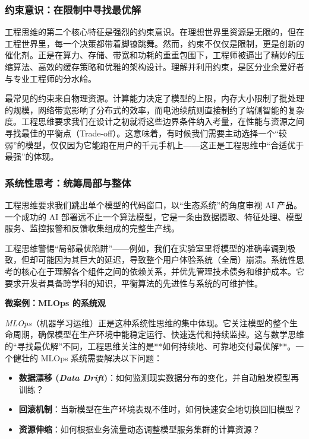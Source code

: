 \subsubsection{约束意识：在限制中寻找最优解}

工程思维的第二个核心特征是强烈的约束意识。在理想世界里资源是无限的，但在工程世界里，每一个决策都带着脚镣跳舞。然而，约束不仅仅是限制，更是创新的催化剂。正是在算力、存储、带宽和功耗的重重包围下，工程师被逼出了精妙的压缩算法、高效的缓存策略和优雅的架构设计。理解并利用约束，是区分业余爱好者与专业工程师的分水岭。

最常见的约束来自物理资源。计算能力决定了模型的上限，内存大小限制了批处理的规模，网络带宽影响了分布式的效率，而电池续航则直接制约了端侧智能的复杂度。工程思维要求我们在设计之初就将这些边界条件纳入考量，在性能与资源之间寻找最佳的平衡点（Trade-off）。这意味着，有时候我们需要主动选择一个“较弱”的模型，仅仅因为它能跑在用户的千元手机上——这正是工程思维中“合适优于最强”的体现。


\subsubsection{系统性思考：统筹局部与整体}

工程思维要求我们跳出单个模型的代码窗口，以“生态系统”的角度审视 AI 产品。一个成功的 AI 部署远不止一个算法模型，它是一条由数据摄取、特征处理、模型服务、监控报警和反馈收集组成的完整生产线。

工程思维警惕“局部最优陷阱”——例如，我们在实验室里将模型的准确率调到极致，但却可能因为其巨大的延迟，导致整个用户体验系统（全局）崩溃。系统性思考的核心在于理解各个组件之间的依赖关系，并优先管理技术债务和维护成本。它要求开发者具备跨学科的知识，平衡算法的先进性与系统的可维护性。

\textbf{微案例：MLOps 的系统观}

\textit{MLOps}（机器学习运维）正是这种系统性思维的集中体现。它关注模型的整个生命周期，确保模型在生产环境中能稳定运行、快速迭代和持续监控。这与数学思维的“寻找最优解”不同，工程思维关注的是**如何持续地、可靠地交付最优解**。一个健壮的 MLOps 系统需要解决以下问题：
\begin{itemize}
    \item \textbf{数据漂移 (\textit{Data Drift})}：如何监测现实数据分布的变化，并自动触发模型再训练？
    \item \textbf{回滚机制}：当新模型在生产环境表现不佳时，如何快速安全地切换回旧模型？
    \item \textbf{资源伸缩}：如何根据业务流量动态调整模型服务集群的计算资源？
\end{itemize}

